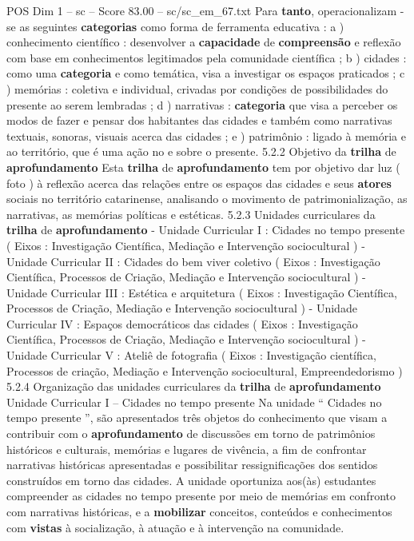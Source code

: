 \begin{textsample}{POS Dim 1 – sc – Score 83.00 – sc/sc\_em\_67.txt}
Para \textbf{tanto}, operacionalizam -se as seguintes \textbf{categorias} como forma de ferramenta educativa : a ) conhecimento científico : desenvolver a \textbf{capacidade} de \textbf{compreensão} e reflexão com base em conhecimentos legitimados pela comunidade científica ; b ) cidades : como uma \textbf{categoria} e como temática, visa a investigar os espaços praticados ; c ) memórias : coletiva e individual, crivadas por condições de possibilidades do presente ao serem lembradas ; d ) narrativas : \textbf{categoria} que visa a perceber os modos de fazer e pensar dos habitantes das cidades e também como narrativas textuais, sonoras, visuais acerca das cidades ; e ) patrimônio : ligado à memória e ao território, que é uma ação no e sobre o presente. 5.2.2 Objetivo da \textbf{trilha} de \textbf{aprofundamento} Esta \textbf{trilha} de \textbf{aprofundamento} tem por objetivo dar luz ( foto ) à reflexão acerca das relações entre os espaços das cidades e seus \textbf{atores} sociais no território catarinense, analisando o movimento de patrimonialização, as narrativas, as memórias políticas e estéticas. 5.2.3 Unidades curriculares da \textbf{trilha} de \textbf{aprofundamento} - Unidade Curricular I : Cidades no tempo presente ( Eixos : Investigação Científica, Mediação e Intervenção sociocultural ) - Unidade Curricular II : Cidades do bem viver coletivo ( Eixos : Investigação Científica, Processos de Criação, Mediação e Intervenção sociocultural ) - Unidade Curricular III : Estética e arquitetura ( Eixos : Investigação Científica, Processos de Criação, Mediação e Intervenção sociocultural ) - Unidade Curricular IV : Espaços democráticos das cidades ( Eixos : Investigação Científica, Processos de Criação, Mediação e Intervenção sociocultural ) - Unidade Curricular V : Ateliê de fotografia ( Eixos : Investigação científica, Processos de criação, Mediação e Intervenção sociocultural, Empreendedorismo ) 5.2.4 Organização das unidades curriculares da \textbf{trilha} de \textbf{aprofundamento} Unidade Curricular I – Cidades no tempo presente Na unidade “ Cidades no tempo presente ”, são apresentados três objetos do conhecimento que visam a contribuir com o \textbf{aprofundamento} de discussões em torno de patrimônios históricos e culturais, memórias e lugares de vivência, a fim de confrontar narrativas históricas apresentadas e possibilitar ressignificações dos sentidos construídos em torno das cidades.
A unidade oportuniza aos(às) estudantes compreender as cidades no tempo presente por meio de memórias em confronto com narrativas históricas, e a \textbf{mobilizar} conceitos, conteúdos e conhecimentos com \textbf{vistas} à socialização, à atuação e à intervenção na comunidade.

\end{textsample}
